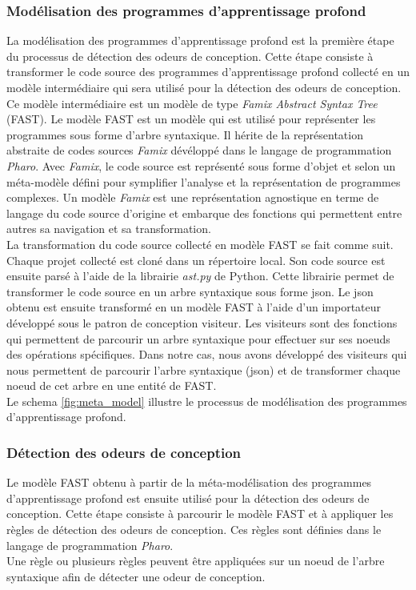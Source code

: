 \subsubsection{Modélisation des programmes d'apprentissage profond}
\label{sec:Meta-modélisation des programmes d'apprentissage profond}
La modélisation des programmes d'apprentissage profond est la première
étape du processus de détection des odeurs de conception. Cette étape consiste à transformer le code source des programmes
d'apprentissage profond collecté en un modèle intermédiaire qui sera utilisé pour la
détection des odeurs de conception. Ce modèle intermédiaire est un modèle de
type \emph{Famix Abstract Syntax Tree} (FAST). Le modèle FAST est un modèle qui
est utilisé pour représenter les programmes sous forme d'arbre syntaxique. Il
hérite de la représentation abstraite de codes sources \emph{Famix} dévéloppé
dans le langage de programmation \emph{Pharo}. Avec \emph{Famix}, le code
source est représenté sous forme d'objet et selon un méta-modèle défini pour symplifier l'analyse et
la représentation de programmes complexes. Un modèle \emph{Famix} est une
représentation agnostique en terme de langage du code source d'origine et embarque des
fonctions qui permettent entre autres sa navigation et sa transformation.\\

La transformation du code source collecté en modèle FAST se fait comme suit.
Chaque projet collecté est cloné dans un répertoire local. Son code source est
ensuite parsé à l'aide de la librairie \emph{ast.py} de Python. Cette librairie
permet de transformer le code source en un arbre syntaxique sous forme json. Le
json obtenu est ensuite transformé en un modèle FAST à l'aide d'un importateur
développé sous le patron de conception visiteur. Les visiteurs sont des fonctions
qui permettent de parcourir un arbre syntaxique pour effectuer sur ses noeuds des opérations
spécifiques. Dans notre cas, nous avons développé des visiteurs qui
nous permettent de parcourir l'arbre syntaxique (json) et de transformer chaque
noeud de cet arbre en une entité de FAST.\\

Le schema \ref{fig:meta_model} illustre le processus de modélisation des
programmes d'apprentissage profond.\\

\subsubsection{Détection des odeurs de conception}
\label{sec:Detection des odeurs de conception}
Le modèle FAST obtenu à partir de la méta-modélisation des programmes
d'apprentissage profond est ensuite utilisé pour la détection des odeurs de
conception. Cette étape consiste à parcourir le modèle FAST et à appliquer les
règles de détection des odeurs de conception. Ces règles sont définies
dans le langage de programmation \emph{Pharo}.\\ Une règle ou plusieurs règles
peuvent être appliquées sur un noeud de l'arbre syntaxique afin de détecter une
odeur de conception.\\

